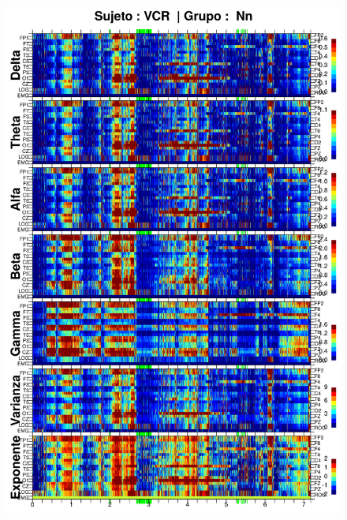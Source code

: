 \begin{figure}
\centering
\includegraphics[width=0.9\linewidth]
{./img_resultados/VCNNS1_espectral_total.png} 
\end{figure}

